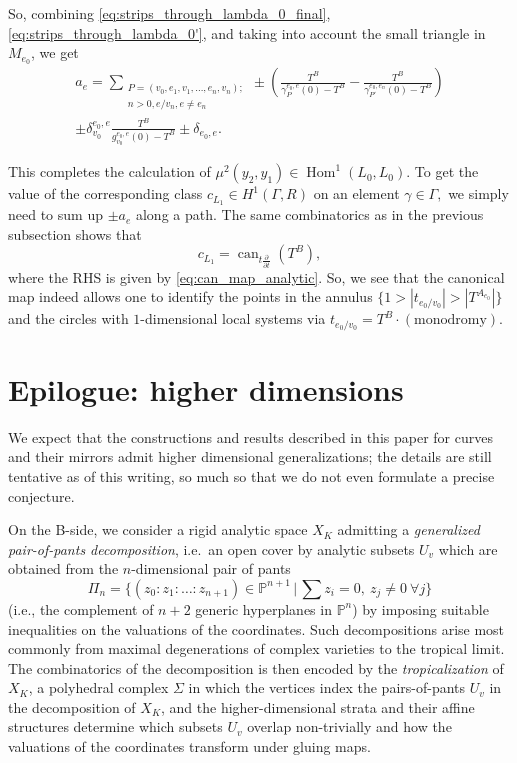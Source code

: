 \documentclass[11pt,leqno]{amsart}
\numberwithin{equation}{section}
\def\PP{{\mathbb P}}
\def\Hom{\operatorname{Hom}}
\newcommand{\can}{\operatorname{can}}
\begin{document}
So, combining \eqref{eq:strips_through_lambda_0_final}, \eqref{eq:strips_through_lambda_0'}, and taking into account the small triangle in $M_{e_0}$, we get
\begin{multline}a_{e}=\sum\limits_{\substack{P=(v_0,e_1,v_1,\dots,e_n,v_n);\\
n>0,e/v_n,e\ne e_n}}\pm\left(\frac{T^B}{\gamma_P^{e_0,e}(0)-T^B}-\frac{T^B}{\gamma_{P'}^{e_0,e_n}(0)-T^B}\right)\\[-1em]
\pm\delta_{v_0}^{e_0,e}\frac{T^B}{g_{v_0}^{e_0,e}(0)-T^B}
\pm\delta_{e_0,e}.\end{multline}

This completes the calculation of $\mu^2(y_2,y_1)\in\Hom^1(L_0,L_0).$ To get the value of the corresponding class $c_{L_1}\in H^1(\Gamma,R)$ on an element $\gamma\in\Gamma,$ we simply need to sum up $\pm a_{e}$ along a path. The same combinatorics as in the previous subsection shows that
$$c_{L_1}=\can_{t\frac{\partial}{\partial t}}(T^B),$$
where the RHS is given by \eqref{eq:can_map_analytic}.
So, we see that the canonical map indeed allows one to identify the points in the annulus $\{1>|t_{e_0/v_0}|>|T^{A_{e_0}}|\}$ and the circles with $1$-dimensional local systems via $t_{e_0/v_0}=T^{B}\cdot(\text{monodromy}).$


\section{Epilogue: higher dimensions} \label{s:higherdim}

We expect that the constructions and results described in this paper
for curves and their mirrors admit higher dimensional generalizations;
the details are still tentative as of this writing, so much so that we
do not even formulate a precise conjecture.

On the B-side, we consider a rigid analytic space $X_K$ admitting a
{\em generalized pair-of-pants decomposition}, i.e.\ an open cover by
analytic subsets $U_v$ which are obtained from the $n$-dimensional
pair of pants $$\Pi_n=\bigl\{(z_0:z_1:\dots:z_{n+1})\in \PP^{n+1}\,\big|\,
{\textstyle \sum z_i=0},\ z_j\neq 0\ \forall j\bigr\}$$ 
(i.e., the complement of $n+2$ generic hyperplanes in $\PP^n$)
by imposing suitable inequalities on the valuations of the coordinates.
Such decompositions arise most commonly from maximal degenerations of
complex varieties to the tropical limit. The combinatorics of the
decomposition is then encoded by the {\em tropicalization} of $X_K$,
a polyhedral complex $\Sigma$ in which the vertices index the
pairs-of-pants $U_v$ in the decomposition of $X_K$, and the higher-dimensional
strata and their affine structures determine which subsets
$U_v$ overlap non-trivially and how the valuations of the coordinates 
transform under gluing maps. 
\end{document}
